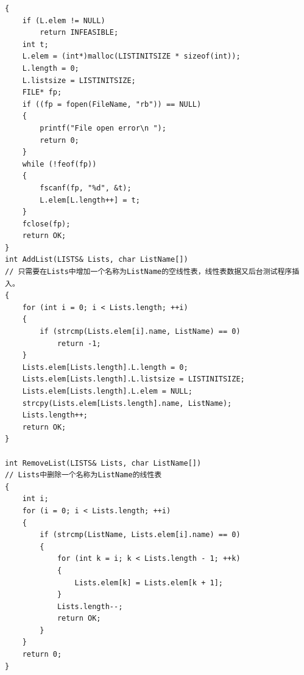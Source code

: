 \documentclass[supercite]{HustGraduPaper}
\theoremstyle{definition}
\begin{document}
\begin{lstlisting}[caption=顺序表,style=顺序表,title=顺序表]
{
	if (L.elem != NULL)
		return INFEASIBLE;
	int t;
	L.elem = (int*)malloc(LISTINITSIZE * sizeof(int));
	L.length = 0;
	L.listsize = LISTINITSIZE;
	FILE* fp;
	if ((fp = fopen(FileName, "rb")) == NULL)
	{
		printf("File open error\n ");
		return 0;
	}
	while (!feof(fp))
	{
		fscanf(fp, "%d", &t);
		L.elem[L.length++] = t;
	}
	fclose(fp);
	return OK;
}
int AddList(LISTS& Lists, char ListName[])
// 只需要在Lists中增加一个名称为ListName的空线性表，线性表数据又后台测试程序插入。
{
	for (int i = 0; i < Lists.length; ++i)
	{
		if (strcmp(Lists.elem[i].name, ListName) == 0)
			return -1;
	}
	Lists.elem[Lists.length].L.length = 0;
	Lists.elem[Lists.length].L.listsize = LISTINITSIZE;
	Lists.elem[Lists.length].L.elem = NULL;
	strcpy(Lists.elem[Lists.length].name, ListName);
	Lists.length++;
	return OK;
}

int RemoveList(LISTS& Lists, char ListName[])
// Lists中删除一个名称为ListName的线性表
{
	int i;
	for (i = 0; i < Lists.length; ++i)
	{
		if (strcmp(ListName, Lists.elem[i].name) == 0)
		{
			for (int k = i; k < Lists.length - 1; ++k)
			{
				Lists.elem[k] = Lists.elem[k + 1];
			}
			Lists.length--;
			return OK;
		}
	}
	return 0;
}


\end{lstlisting}
\end{document}
